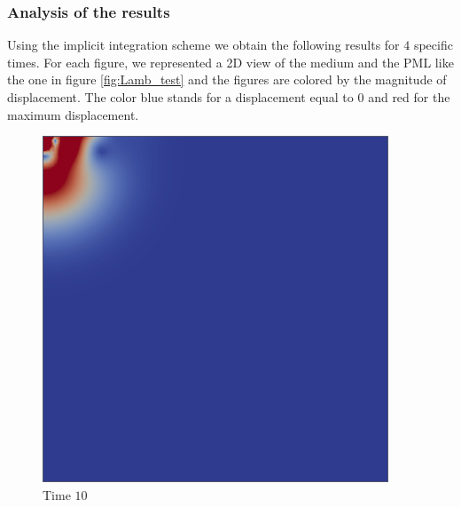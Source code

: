 \subsubsection{Analysis of the results}
Using the implicit integration scheme we obtain the following results for $4$ specific times. For each figure, we represented a 2D view of the medium and the PML like the one in figure \ref{fig:Lamb_test} and the figures are colored by the magnitude of displacement. The color blue stands for a displacement equal to $0$ and red for the maximum displacement.    
\begin{figure}[H]
\centering
\begin{minipage}{.5\textwidth}
  \centering
  \includegraphics[width=1.\linewidth]{images/Lamb1.png}
  \caption{Time $10$}
  \label{fig:Lamb1}
\end{minipage}%
\begin{minipage}{.5\textwidth}
  \centering

\end{minipage}
\end{figure}
